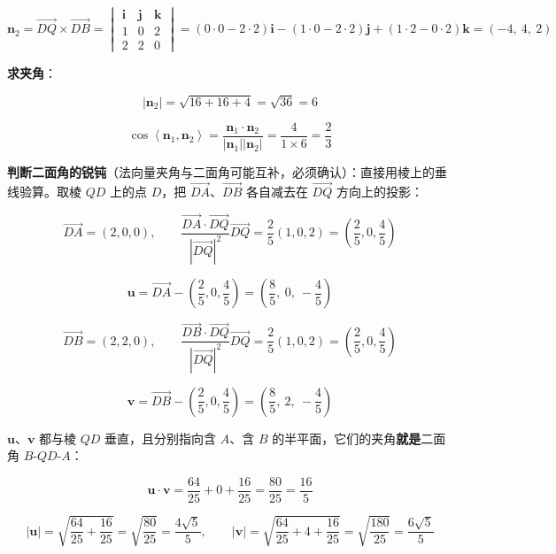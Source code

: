 \begin{answer}
\nopagebreak[4]
\[\boldsymbol n_2=\overrightarrow{DQ}\times\overrightarrow{DB}=\begin{vmatrix}\boldsymbol i&\boldsymbol j&\boldsymbol k\\ 1&0&2\\ 2&2&0\end{vmatrix}=(0\cdot0-2\cdot2)\boldsymbol i-(1\cdot0-2\cdot2)\boldsymbol j+(1\cdot2-0\cdot2)\boldsymbol k=(-4,\ 4,\ 2)\]

\textbf{求夹角}：

\nopagebreak[4]
\[\left|\boldsymbol n_2\right|=\sqrt{16+16+4}=\sqrt{36}=6\]

\nopagebreak[4]
\[\cos\left\langle\boldsymbol n_1,\boldsymbol n_2\right\rangle=\frac{\boldsymbol n_1\cdot\boldsymbol n_2}{\left|\boldsymbol n_1\right|\left|\boldsymbol n_2\right|}=\frac{4}{1\times6}=\frac23\]

\textbf{判断二面角的锐钝}（法向量夹角与二面角可能互补，必须确认）：直接用棱上的垂线验算。取棱 $QD$ 上的点 $D$，把 $\overrightarrow{DA}$、$\overrightarrow{DB}$ 各自减去在 $\overrightarrow{DQ}$ 方向上的投影：

\nopagebreak[4]
\[\overrightarrow{DA}=(2,0,0),\qquad \frac{\overrightarrow{DA}\cdot\overrightarrow{DQ}}{\left|\overrightarrow{DQ}\right|^{2}}\overrightarrow{DQ}=\frac25(1,0,2)=\left(\frac25,0,\frac45\right)\]

\nopagebreak[4]
\[\boldsymbol u=\overrightarrow{DA}-\left(\frac25,0,\frac45\right)=\left(\frac85,\ 0,\ -\frac45\right)\]

\nopagebreak[4]
\[\overrightarrow{DB}=(2,2,0),\qquad \frac{\overrightarrow{DB}\cdot\overrightarrow{DQ}}{\left|\overrightarrow{DQ}\right|^{2}}\overrightarrow{DQ}=\frac25(1,0,2)=\left(\frac25,0,\frac45\right)\]

\nopagebreak[4]
\[\boldsymbol v=\overrightarrow{DB}-\left(\frac25,0,\frac45\right)=\left(\frac85,\ 2,\ -\frac45\right)\]

$\boldsymbol u$、$\boldsymbol v$ 都与棱 $QD$ 垂直，且分别指向含 $A$、含 $B$ 的半平面，它们的夹角\textbf{就是}二面角 $B\text{-}QD\text{-}A$：

\nopagebreak[4]
\[\boldsymbol u\cdot\boldsymbol v=\frac{64}{25}+0+\frac{16}{25}=\frac{80}{25}=\frac{16}5\]

\nopagebreak[4]
\[|\boldsymbol u|=\sqrt{\frac{64}{25}+\frac{16}{25}}=\sqrt{\frac{80}{25}}=\frac{4\sqrt5}5,\qquad |\boldsymbol v|=\sqrt{\frac{64}{25}+4+\frac{16}{25}}=\sqrt{\frac{180}{25}}=\frac{6\sqrt5}5\]


\end{answer}
